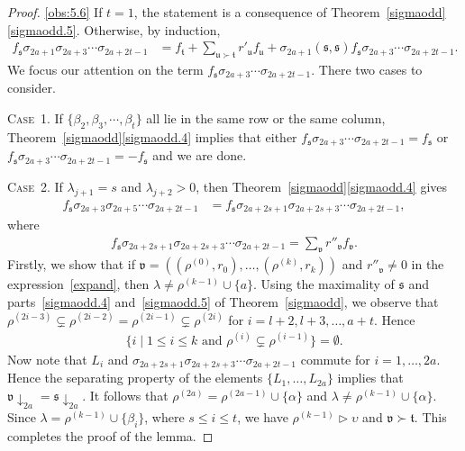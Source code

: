 \documentclass[11pt,a4paper,reqno,svgnames]{amsart}
\theoremstyle{plain}
\theoremstyle{definition}
\numberwithin{equation}{section}
\begin{document}
\begin{proof}
\eqref{obs:5.6} If $t=1$, the statement is a consequence of Theorem~\ref{sigmaodd}\eqref{sigmaodd.5}. Otherwise, by induction,  
\begin{align*}
f_\mathfrak{s}\sigma_{2a+1} \sigma_{2a+3}\cdots \sigma_{2a+2t-1} &=f_\mathfrak{t}+\sum_{\mathfrak{u}\succ\mathfrak{t}} r'_\mathfrak{u}f_\mathfrak{u}+ \sigma_{2a+1}(\mathfrak{s,s})f_\mathfrak{s}\sigma_{2a+3}\cdots \sigma_{2a+2t-1}.
\end{align*}
We focus our attention on the term $f_\mathfrak{s}\sigma_{2a+3}\cdots \sigma_{2a+2t-1}$. There two cases to consider. 

{\textsc{Case~1.}} If $\lbrace \beta_2,\beta_3,\cdots, \beta_t\rbrace$ all lie in the same row or the same column, Theorem~\ref{sigmaodd}\eqref{sigmaodd.4} implies that either $f_\mathfrak{s}\sigma_{2a+3}\cdots \sigma_{2a+2t-1} = f_\mathfrak{s}$ or $f_\mathfrak{s}\sigma_{2a+3}\cdots \sigma_{2a+2t-1} = -f_\mathfrak{s}$ and we are done. 

{\textsc{Case~2.}} If $\lambda_{j+1}=s$ and $\lambda_{j+2}>0$, then Theorem~\ref{sigmaodd}\eqref{sigmaodd.4} gives 
\begin{align*}
f_\mathfrak{s}\sigma_{2a+3}\sigma_{2a+5}\cdots \sigma_{2a+2t-1}&= f_\mathfrak{s}\sigma_{2a+2s+1}\sigma_{2a+2s+3}\cdots \sigma_{2a+2t-1},
\end{align*} 
where
\begin{align}\label{expand}
f_\mathfrak{s}\sigma_{2a+2s+1}\sigma_{2a+2s+3}\cdots \sigma_{2a+2t-1}=\sum_{\mathfrak{v}} r''_\mathfrak{v}f_\mathfrak{v}.
\end{align}
Firstly, we  show that if $\mathfrak{v}=((\rho^{(0)},r_0),\ldots,(\rho^{(k)},r_k))$ and $r''_\mathfrak{v}\ne0$ in the expression~\eqref{expand}, then $\lambda\ne \rho^{(k-1)}\cup\lbrace a\rbrace$. Using the maximality of $\mathfrak{s}$ and  parts~\eqref{sigmaodd.4} and~\eqref{sigmaodd.5} of Theorem~\ref{sigmaodd}, we observe that $\rho^{(2i-3)}\subsetneq\rho^{(2i-2)}=\rho^{(2i-1)}\subsetneq\rho^{(2i)}$ for $i=l+2,l+3,\ldots,a+t$. Hence
\begin{align*}
\big\lbrace i\mid 1{\leqslant} i{\leqslant} k\text{ and } \rho^{(i)}\subsetneq\rho^{(i-1)}\big\rbrace=\emptyset.
\end{align*}
Now note that $L_{i}$ and  $\sigma_{2a+2s+1}\sigma_{2a+2s+3}\cdots \sigma_{2a+2t-1}$ commute for $i=1,\ldots,2a$. Hence the separating property of the elements $\lbrace L_1,\ldots,L_{2a}\rbrace$ implies that $\mathfrak{v}\downarrow_{2a}=\mathfrak{s}\downarrow_{2a}$. It follows that $\rho^{(2a)}=\rho^{(2a-1)}\cup\lbrace\alpha\rbrace$ and $\lambda\ne\rho^{(k-1)}\cup\lbrace \alpha\rbrace$. Since $\lambda=\rho^{(k-1)}\cup \lbrace\beta_i\rbrace$, where $s{\leqslant} i{\leqslant} t$, we have $\rho^{(k-1)}\rhd\upsilon$ and $\mathfrak{v}\succ\mathfrak{t}$. This completes the proof of the lemma. 
\end{proof}
\end{document}
